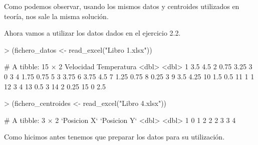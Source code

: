 \documentclass[parskip=full]{scrartcl}
\begin{document}
Como podemos observar, usando los mismos datos y centroides utilizados en teoría, nos sale la misma solución.

Ahora vamos a utilizar los datos dados en el ejercicio 2.2.


\begin{Schunk}
\begin{Sinput}
> (fichero_datos <- read_excel("Libro 1.xlsx"))
\end{Sinput}
\begin{Soutput}
# A tibble: 15 × 2
   Velocidad Temperatura
       <dbl>       <dbl>
 1      3.5         4.5 
 2      0.75        3.25
 3      0           3   
 4      1.75        0.75
 5      3           3.75
 6      3.75        4.5 
 7      1.25        0.75
 8      0.25        3   
 9      3.5         4.25
10      1.5         0.5 
11      1           1   
12      3           4   
13      0.5         3   
14      2           0.25
15      0           2.5 
\end{Soutput}
\begin{Sinput}
> (fichero_centroides <- read_excel("Libro 4.xlsx"))
\end{Sinput}
\begin{Soutput}
# A tibble: 3 × 2
  `Posicion X` `Posicion Y`
         <dbl>        <dbl>
1            0            1
2            2            2
3            3            4
\end{Soutput}
\end{Schunk}


Como hicimos antes tenemos que preparar los datos para su utilización.
\end{document}
